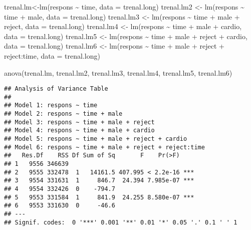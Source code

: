 \documentclass[
]{article}
\newenvironment{Shaded}{\begin{snugshade}}{\end{snugshade}}
\newcommand{\AttributeTok}[1]{\textcolor[rgb]{0.77,0.63,0.00}{#1}}
\newcommand{\FunctionTok}[1]{\textcolor[rgb]{0.00,0.00,0.00}{#1}}
\newcommand{\NormalTok}[1]{#1}
\newcommand{\OtherTok}[1]{\textcolor[rgb]{0.56,0.35,0.01}{#1}}
\newcommand{\SpecialCharTok}[1]{\textcolor[rgb]{0.00,0.00,0.00}{#1}}
\begin{document}
\begin{Shaded}
\begin{Highlighting}[]
\NormalTok{trenal.lm}\OtherTok{\textless{}{-}}\FunctionTok{lm}\NormalTok{(respons }\SpecialCharTok{\textasciitilde{}}\NormalTok{ time, }\AttributeTok{data =}\NormalTok{ trenal.long)}
\NormalTok{trenal.lm2 }\OtherTok{\textless{}{-}} \FunctionTok{lm}\NormalTok{(respons }\SpecialCharTok{\textasciitilde{}}\NormalTok{ time }\SpecialCharTok{+}\NormalTok{ male, }\AttributeTok{data =}\NormalTok{ trenal.long)}
\NormalTok{trenal.lm3 }\OtherTok{\textless{}{-}} \FunctionTok{lm}\NormalTok{(respons }\SpecialCharTok{\textasciitilde{}}\NormalTok{ time }\SpecialCharTok{+}\NormalTok{ male }\SpecialCharTok{+}\NormalTok{ reject, }\AttributeTok{data =}\NormalTok{ trenal.long)}
\NormalTok{trenal.lm4 }\OtherTok{\textless{}{-}} \FunctionTok{lm}\NormalTok{(respons }\SpecialCharTok{\textasciitilde{}}\NormalTok{ time }\SpecialCharTok{+}\NormalTok{ male }\SpecialCharTok{+}\NormalTok{ cardio, }\AttributeTok{data =}\NormalTok{ trenal.long)}
\NormalTok{trenal.lm5 }\OtherTok{\textless{}{-}} \FunctionTok{lm}\NormalTok{(respons }\SpecialCharTok{\textasciitilde{}}\NormalTok{ time }\SpecialCharTok{+}\NormalTok{ male }\SpecialCharTok{+}\NormalTok{ reject }\SpecialCharTok{+}\NormalTok{ cardio, }\AttributeTok{data =}\NormalTok{ trenal.long)}
\NormalTok{trenal.lm6 }\OtherTok{\textless{}{-}} \FunctionTok{lm}\NormalTok{(respons }\SpecialCharTok{\textasciitilde{}}\NormalTok{ time }\SpecialCharTok{+}\NormalTok{ male }\SpecialCharTok{+}\NormalTok{ reject }\SpecialCharTok{+}\NormalTok{ reject}\SpecialCharTok{:}\NormalTok{time, }\AttributeTok{data =}\NormalTok{ trenal.long)}

\FunctionTok{anova}\NormalTok{(trenal.lm, trenal.lm2, trenal.lm3, trenal.lm4, trenal.lm5, trenal.lm6)}
\end{Highlighting}
\end{Shaded}

\begin{verbatim}
## Analysis of Variance Table
## 
## Model 1: respons ~ time
## Model 2: respons ~ time + male
## Model 3: respons ~ time + male + reject
## Model 4: respons ~ time + male + cardio
## Model 5: respons ~ time + male + reject + cardio
## Model 6: respons ~ time + male + reject + reject:time
##   Res.Df    RSS Df Sum of Sq       F    Pr(>F)    
## 1   9556 346639                                   
## 2   9555 332478  1   14161.5 407.995 < 2.2e-16 ***
## 3   9554 331631  1     846.7  24.394 7.985e-07 ***
## 4   9554 332426  0    -794.7                      
## 5   9553 331584  1     841.9  24.255 8.580e-07 ***
## 6   9553 331630  0     -46.6                      
## ---
## Signif. codes:  0 '***' 0.001 '**' 0.01 '*' 0.05 '.' 0.1 ' ' 1
\end{verbatim}
\end{document}
